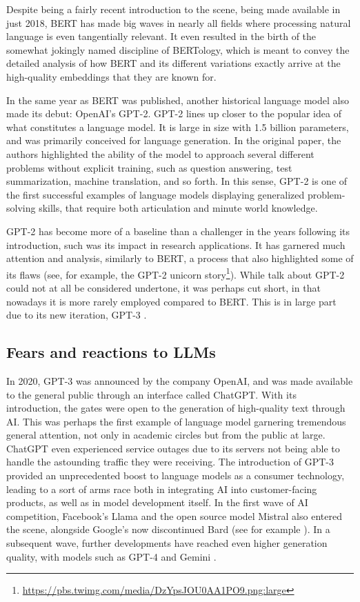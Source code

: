 Despite being a fairly recent introduction to the scene, being made available in just 2018, BERT has made big waves in nearly all fields where processing natural language is even tangentially relevant.
It even resulted in the birth of the somewhat jokingly named discipline of BERTology, which is meant to convey the detailed analysis of how BERT and its different variations exactly arrive at the high-quality embeddings that they are known for.

In the same year as BERT was published, another historical language model also made its debut: OpenAI's GPT-2.
GPT-2 \citep{radford2019language} lines up closer to the popular idea of what constitutes a language model. It is large in size with 1.5 billion parameters, and was primarily conceived for language generation.
In the original paper, the authors highlighted the ability of the model to approach several different problems without explicit training, such as question answering, test summarization, machine translation, and so forth.
In this sense, GPT-2 is one of the first successful examples of language models displaying generalized problem-solving skills, that require both articulation and minute world knowledge.

GPT-2 has become more of a baseline than a challenger in the years following its introduction, such was its impact in research applications. It has garnered much attention and analysis, similarly to BERT, a process that also highlighted some of its flaws (see, for example, the GPT-2 unicorn story\footnote{\url{https://pbs.twimg.com/media/DzYpsJOU0AA1PO9.png:large}}). While talk about GPT-2 could not at all be considered undertone, it was perhaps cut short, in that nowadays it is more rarely employed compared to BERT. This is in large part due to its new iteration, GPT-3 \citep{brown2020language}.

\subsection{Fears and reactions to LLMs}

In 2020, GPT-3 was announced by the company OpenAI, and was made available to the general public through an interface called ChatGPT. With its introduction, the gates were open to the generation of high-quality text through AI.
This was perhaps the first example of language model garnering tremendous general attention, not only in academic circles but from the public at large. ChatGPT even experienced service outages due to its servers not being able to handle the astounding traffic they were receiving.
The introduction of GPT-3 provided an unprecedented boost to language models as a consumer technology, leading to a sort of arms race both in integrating AI into customer-facing products, as well as in model development itself.
In the first wave of AI competition, Facebook's Llama \citep{touvron2023llama} and the open source model Mistral \citep{jiang2023mistral} also entered the scene, alongside Google's now discontinued Bard (see for example \citet{fowler2023bard}). In a subsequent wave, further developments have reached even higher generation quality, with models such as GPT-4 \citep{openai2024gpt4technicalreport} and Gemini \citep{geminiteam2024geminifamilyhighlycapable}.

